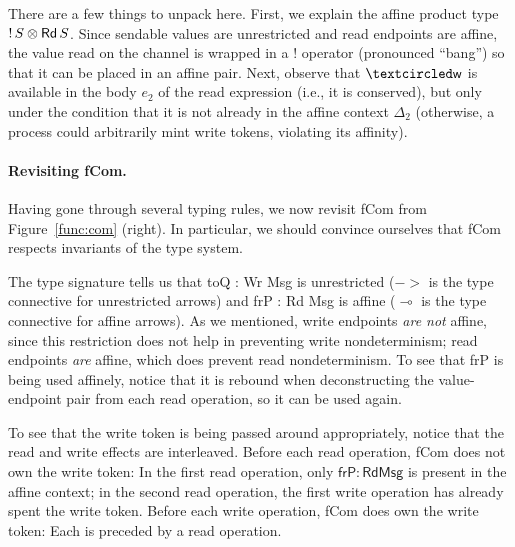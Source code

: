 There are a few things to unpack here. First, we explain the affine product type
${{!}\,{S}}\otimes{{\textnormal{\textsf{Rd}}\,S}}$. Since sendable values are unrestricted and
read endpoints are affine, the value read on the channel is wrapped in a $!$
operator (pronounced ``bang'') so that it can be placed in an affine pair. Next,
observe that $\wrtok$ is available in the body $e_2$ of the read expression
(i.e., it is conserved), but only under the condition that it is not already in
the affine context $\Delta_2$ (otherwise, a process could arbitrarily mint write
tokens, violating its affinity).

\paragraph{Revisiting \textsf{fCom}.} Having gone through several typing rules, we now revisit \textsf{fCom} from
Figure~\ref{func:com} (right). In particular, we should convince ourselves that
\textsf{fCom} respects invariants of the type system.

The type signature tells us that \textsf{toQ : Wr Msg} is unrestricted ($->$
is the type connective for unrestricted arrows) and \textsf{frP : Rd Msg} is
affine ($\multimap$ is the type connective for affine arrows). As we mentioned, write
endpoints \emph{are not} affine, since this restriction does not help in
preventing write nondeterminism; read endpoints \emph{are} affine, which does
prevent read nondeterminism. To see that \textsf{frP} is being used affinely,
notice that it is rebound when deconstructing the value-endpoint pair from each
read operation, so it can be used again.

To see that the write token is being passed around appropriately, notice that
the read and write effects are interleaved. Before each read operation,
\textsf{fCom} does not own the write token: In the first read operation, only
$\mathsf{frP} : \mathsf{Rd Msg}$ is present in the affine context; in the second
read operation, the first write operation has already spent the write
token. Before each write operation, \textsf{fCom} does own the write token: Each
is preceded by a read operation.


